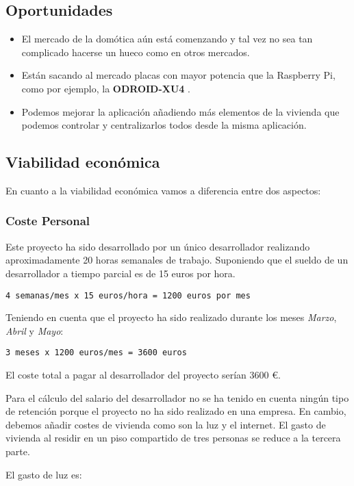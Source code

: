 \subsection{Oportunidades}

\begin{itemize}
	\item El mercado de la domótica aún está comenzando y tal vez no sea tan complicado hacerse un hueco como en otros mercados.
	\item Están sacando al mercado placas con mayor potencia que la Raspberry Pi, como por ejemplo, la \textbf{ODROID-XU4} \cite{placa:odroid}.
	\item Podemos mejorar la aplicación añadiendo más elementos de la vivienda que podemos controlar y centralizarlos todos desde la misma aplicación.
\end{itemize}

\subsection{Viabilidad económica}

En cuanto a la viabilidad económica vamos a diferencia entre dos aspectos:

\subsubsection{Coste Personal}

Este proyecto ha sido desarrollado por un único desarrollador realizando aproximadamente 20 horas semanales de trabajo. Suponiendo que el sueldo de un desarrollador a tiempo parcial es de 15 euros por hora.

\verb|4 semanas/mes x 15 euros/hora = 1200 euros por mes|

Teniendo en cuenta que el proyecto ha sido realizado durante los meses \textit{Marzo}, \textit{Abril} y \textit{Mayo}:

\verb|3 meses x 1200 euros/mes = 3600 euros|

El coste total a pagar al desarrollador del proyecto serían 3600 \euro.

Para el cálculo del salario del desarrollador no se ha tenido en cuenta ningún tipo de retención porque el proyecto no ha sido realizado en una empresa. En cambio, debemos añadir costes de vivienda como son la luz y el internet. El gasto de vivienda al residir en un piso compartido de tres personas se reduce a la tercera parte.

El gasto de luz es:

